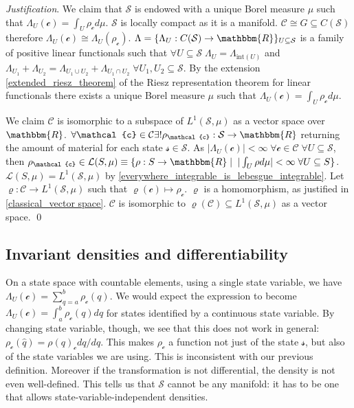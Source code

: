\documentclass[aps,pra,10pt,twocolumn,floatfix,nofootinbib]{revtex4-1}
\numberwithin{equation}{section}
\theoremstyle{definition}
\newenvironment{justification}{\emph{Justification}.}{\qed}
\begin{document}
\begin{justification}
	We claim that $\mathcal{S}$ is endowed with a unique Borel measure $\mu$ such that $\Lambda_U (\mathcal{c}) = \int_U \rho_{\mathcal{c}} d \mu$.  $\mathcal{S}$ is locally compact as it is a manifold. $\mathcal{C} \cong G \subseteq C(\mathcal{S})$ therefore $\Lambda_U(\mathcal{c}) \cong \Lambda_U(\rho_\mathcal{c})$. $\Lambda = \{\Lambda_U : C(\mathcal{S}) \rightarrow \mathbbm{R}\}_{U \subseteq \mathcal{S}}$ is a family of positive linear functionals such that $\forall U \subseteq \mathcal{S} \; \Lambda_U = \Lambda_{\mathrm{int}(U)}$ and $\Lambda_{U_1} + \Lambda_{U_2} = \Lambda_{U_1 \cup U_2} + \Lambda_{U_1 \cap U_2} \; \forall U_1, U_2 \subseteq \mathcal{S}$. By the extension \ref{extended_riesz_theorem} of the Riesz representation theorem for linear functionals 
	there exists a unique Borel measure $\mu$ such that $\Lambda_U (\mathcal{c}) = \int_{U} \rho_\mathcal{c} d\mu$.

	We claim $\mathcal{C}$ is isomorphic to a subspace of $L^1(\mathcal{S}, \mu)$ as a vector space over $\mathbbm{R}$. $\forall \mathcal{c} \in \mathcal{C} \exists ! \rho_{\mathcal{c}}:\mathcal{S} \rightarrow \mathbbm{R}$ returning the amount of material for each state $\mathcal{s} \in \mathcal{S}$. As $|\Lambda_{U}(\mathcal{c})| < \infty \; \forall \mathcal{c} \in \mathcal{C} \; \forall U \subseteq \mathcal{S}$, then $\rho_{\mathcal{c}} \in \mathcal{L}(S,\mu) \equiv \{ \rho : S \rightarrow \mathbbm{R} \; | \;\; |\int_{U} \rho d\mu| < \infty \; \forall U \subseteq S\}$. $\mathcal{L}(S,\mu) = L^1(\mathcal{S}, \mu)$ by \ref{everywhere_integrable_is_lebesgue_integrable}. Let $\varrho : \mathcal{C} \rightarrow L^1(\mathcal{S}, \mu)$ such that $\varrho(\mathcal{c}) \mapsto \rho_\mathcal{c}$. $\varrho$ is a homomorphism, as justified in \ref{classical_vector space}. $\mathcal{C}$ is isomorphic to $\varrho(\mathcal{C}) \subseteq L^1(\mathcal{S}, \mu)$ as a vector space.
\end{justification}

\subsection{Invariant densities and differentiability}

On a state space with countable elements, using a single state variable, we have $\Lambda_U (\mathcal{c}) = \sum \limits_{q=a}^b \rho_\mathcal{c}(q)$. We would expect the expression to become $\Lambda_U (\mathcal{c}) = \int_a^b \rho_\mathcal{c} (q) dq$ for states identified by a continuous state variable. By changing state variable, though, we see that this does not work in general: $\rho_\mathcal{c}(\hat{q})= \rho(q)_\mathcal{c} dq/d\hat{q}$. This makes $\rho_\mathcal{c}$ a function not just of the state $\mathcal{s}$, but also of the state variables we are using. This is inconsistent with our previous definition. Moreover if the transformation is not differential, the density is not even well-defined. This tells us that $\mathcal{S}$ cannot be any manifold: it has to be one that allows state-variable-independent densities.
\end{document}
